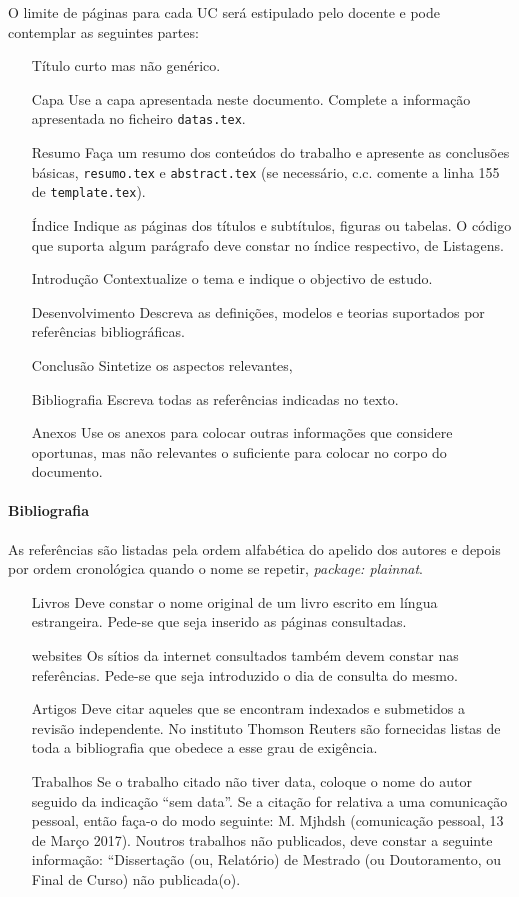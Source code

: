 O limite de páginas para cada UC será estipulado pelo docente e pode contemplar as seguintes partes: 
\begin{enumerate}
\item[Título] curto mas não genérico.
\item[Capa] Use a capa apresentada neste documento. Complete a informação apresentada no ficheiro \texttt{datas.tex}.
\item[Resumo] Faça um resumo dos conteúdos do trabalho e apresente as conclusões básicas, \texttt{resumo.tex} e \texttt{abstract.tex} (se necessário, c.c. comente a linha 155 de \texttt{template.tex}).
\item[Índice] Indique as páginas dos títulos e subtítulos, figuras ou tabelas. O código que suporta algum parágrafo deve constar no índice respectivo, de Listagens.
\item[Introdução] Contextualize o tema e indique o objectivo de estudo.
\item[Desenvolvimento] Descreva as definições, modelos e teorias suportados por referências bibliográficas. 
\item[Conclusão] Sintetize os aspectos relevantes,
\item[Bibliografia] Escreva todas as referências indicadas no texto.
\item[Anexos] Use os anexos para colocar outras informações que considere oportunas, mas não relevantes o suficiente para colocar no corpo do documento. 
\end{enumerate}

\paragraph{Bibliografia}
As referências são listadas pela ordem alfabética do apelido dos autores e depois por ordem cronológica quando o nome se repetir, \textit{package: plainnat}. 

\begin{enumerate}
\item[Livros] Deve constar o nome original de um livro escrito em língua estrangeira. Pede-se que seja inserido as páginas consultadas. 
\item[websites] Os sítios da internet consultados também devem constar nas referências. Pede-se que seja introduzido o dia de consulta do mesmo.
\item[Artigos] Deve citar aqueles que se encontram indexados e submetidos a revisão independente. No instituto Thomson Reuters são fornecidas listas de toda a bibliografia que obedece a esse grau de exigência.
\item[Trabalhos] Se o trabalho citado não tiver data, coloque o nome do autor seguido da indicação ``sem data''. Se a citação for relativa a uma comunicação pessoal, então faça-o do modo seguinte: M. Mjhdsh (comunicação pessoal, 13 de Março 2017). Noutros trabalhos não publicados, deve constar a seguinte informação: ``Dissertação (ou, Relatório) de Mestrado (ou Doutoramento, ou Final de Curso) não publicada(o). 
\end{enumerate}

